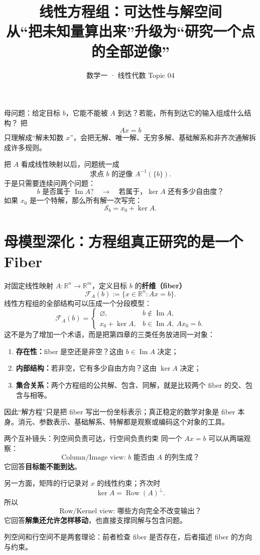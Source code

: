 \documentclass[11pt,a4paper]{ctexart}
\title{\vspace{-1.1cm}\textbf{线性方程组：可达性与解空间}\\[0.4em]
\large 从“把未知量算出来”升级为“研究一个点的全部逆像”}
\author{数学一 · 线性代数 Topic 04}
\date{}
\newcommand{\kw}[1]{\textbf{\color{deep}#1}}
\begin{document}
\maketitle

\begin{corebox}{母问题：给定目标 $b$，它能不能被 $A$ 到达？若能，所有到达它的输入组成什么结构？}
把
\[
Ax=b
\]
只理解成“解未知数 $x$”，会把无解、唯一解、无穷多解、基础解系和非齐次通解拆成许多规则。

把 $A$ 看成线性映射以后，问题统一成
\[
\boxed{\text{求点 }b\text{ 的逆像 }A^{-1}(\{b\}).}
\]
于是只需要连续问两个问题：
\[
\boxed{
\text{$b$ 是否属于 }\operatorname{Im}A?
\quad\longrightarrow\quad
\text{若属于，}\ker A\text{ 还有多少自由度？}
}
\]
如果 $x_0$ 是一个特解，那么所有解一次写完：
\[
\boxed{\mathcal S_b=x_0+\ker A.}
\]
\end{corebox}

\section{母模型深化：方程组真正研究的是一个 Fiber}

对固定线性映射 $A:\mathbb R^n\to\mathbb R^m$，定义目标 $b$ 的\kw{纤维（fiber）}
\[
\mathcal F_A(b):=\{x\in\mathbb R^n:Ax=b\}.
\]
线性方程组的全部结构可以压成一个分段模型：
\[
\boxed{
\mathcal F_A(b)=
\begin{cases}
\varnothing, & b\notin\operatorname{Im}A,\\[0.2em]
 x_0+\ker A, & b\in\operatorname{Im}A,\ Ax_0=b.
\end{cases}}
\]
这不是为了增加一个术语，而是把第四章的三类任务放进同一对象：
\begin{enumerate}
  \item \kw{存在性：}fiber 是空还是非空？这由 $b\in\operatorname{Im}A$ 决定；
  \item \kw{内部结构：}若非空，它有多少自由方向？这由 $\ker A$ 决定；
  \item \kw{集合关系：}两个方程组的公共解、包含、同解，就是比较两个 fiber 的交、包含与相等。
\end{enumerate}

因此“解方程”只是把 fiber 写出一份坐标表示；真正稳定的数学对象是 fiber 本身。消元、参数表示、基础解系、特解都是观察或编码这个对象的工具。

\begin{corebox}{两个互补镜头：列空间负责可达，行空间负责约束}
同一个 $Ax=b$ 可以从两端观察：
\[
\boxed{\text{Column/Image view: }b\text{ 能否由 }A\text{ 的列生成？}}
\]
它回答\kw{目标能不能到达}。

另一方面，矩阵的行记录对 $x$ 的线性约束；齐次时
\[
\ker A=\operatorname{Row}(A)^\perp.
\]
所以
\[
\boxed{\text{Row/Kernel view: 哪些方向完全不改变输出？}}
\]
它回答\kw{解集还允许怎样移动}，也直接支撑同解与包含问题。

列空间和行空间不是两套理论：前者检查 fiber 是否存在，后者描述 fiber 的方向与约束。
\end{corebox}
\end{document}
